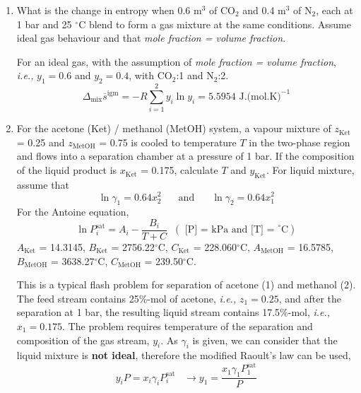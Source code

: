 \documentclass[12pts,a4paper,amsmath,amssymb,floatfix]{article}%
\newcommand{\frc}{\displaystyle\frac}
\newcommand{\ie}{{\it i.e., }}
\newcommand{\summation}[3][error]{\sum\limits_{#2}^{#3}#1}
\begin{document}
\begin{enumerate}[1)]
\clearpage
            
   \item\label{Mod05Ex06} What is the change in entropy when 0.6 m$^{3}$ of CO$_{2}$ and 0.4 m$^{3}$ of N$_{2}$, each at 1 bar and 25 $^{\circ}$C blend to form a gas mixture at the same conditions. Assume ideal gas behaviour and that {\it mole fraction = volume fraction}. 

        For an ideal gas, with the assumption of {\it mole fraction = volume fraction}, \ie $y_{1} = 0.6$ and $y_{2} = 0.4$, with CO$_{2}$:1 and N$_{2}$:2.
      \begin{displaymath}
          \Delta_{\text{mix}}\overline{s}^{\text{igm}} = -R\summation[y_{i}\ln{y_{i}}]{i=1}{2} = 5.5954 \text{ J.(mol.K)}^{-1}
      \end{displaymath}


\clearpage
            
   \item\label{Mod05Ex07}  For the acetone (Ket) / methanol (MetOH) system, a vapour mixture of $z_{\text{Ket}}$ = 0.25 and $z_{\text{MetOH}}$ = 0.75 is cooled to temperature $T$ in the two-phase region and flows into a separation chamber at a pressure of 1 bar. If the composition of the liquid product is $x_{\text{Ket}}$ = 0.175, calculate $T$  and $y_{\text{Ket}}$. For liquid mixture, assume that
\begin{displaymath}
\ln\gamma_{1} = 0.64x_{2}^{2} \;\;\;\;\;\text{ and }\;\;\;\;\;\ln\gamma_{2}=0.64x_{1}^{2}
\end{displaymath}
For the Antoine equation, 
\begin{displaymath}
\ln P_{i}^{\text{sat}} = A_{i} - \frc{B_{i}}{T + C} \;\;\left(\text{ [P] = kPa and [T] = }^{\circ}\text{C}\right)
\end{displaymath}
$A_{\text{Ket}}$ = 14.3145, $B_{\text{Ket}}$ = 2756.22$^{\circ}$C, $C_{\text{Ket}}$ = 228.060$^{\circ}$C, $A_{\text{MetOH}}$ = 16.5785, $B_{\text{MetOH}}$ = 3638.27$^{\circ}$C, $C_{\text{MetOH}}$ = 239.50$^{\circ}$C.

        This is a typical flash problem for separation of acetone (1) and methanol (2). The feed stream contains 25$\%$-mol of acetone, \ie $z_{1}=0.25$, and after the separation at 1 bar, the resulting liquid stream contains 17.5$\%$-mol, \ie $x_{1}=0.175$. The problem requires temperature of the separation and composition of the gas stream, $y_{i}$. As $\gamma_{i}$ is given, we can consider that the liquid mixture is {\bf not ideal}, therefore the modified Raoult's law can be used,
\begin{displaymath}
    y_{i}P = x_{i}\gamma_{i}P_{i}^{\text{sat}} \;\;\;\longrightarrow y_{1}=\frc{x_{1}\gamma_{1}P_{1}^{\text{sat}}}{P}
\end{displaymath}
    

\end{enumerate}
\end{document}
